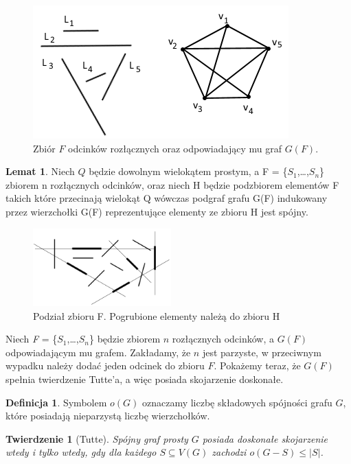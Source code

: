 \documentclass[brudnopis]{xmgr}
\newtheorem{Twierdzenie}{Twierdzenie} \theoremstyle{definition}
\newtheorem{Lemat}{Lemat} \theoremstyle{definition}
\newtheorem{Definicja}{Definicja} \theoremstyle{definition}
\begin{document}
\begin{figure}[ht!]\label{zbior odcinkow rozlacznych}
 \centering
  \includegraphics{rysunki/g_f.png}
  \caption{Zbiór $F$ odcinków rozłącznych oraz odpowiadający mu graf $G(F)$.}
\end{figure} 

\begin{Lemat}\label{podgraf indukowany}
Niech $Q$ będzie dowolnym wielokątem prostym, a F = \textnormal{\{}$S_1$,\ldots,$S_n$\textnormal{\}} zbiorem n rozłącznych odcinków, oraz niech H będzie podzbiorem elementów F takich które przecinają wielokąt Q wówczas podgraf grafu G\textnormal{(}F\textnormal{)} indukowany przez wierzchołki G\textnormal{(}F\textnormal{)} reprezentujące elementy ze zbioru H jest spójny.
\end{Lemat}
\begin{figure}[ht!]
 \centering
  \includegraphics[height=3cm]{rysunki/podzial_h.png}
  \caption{Podział zbioru F. Pogrubione elementy należą do zbioru H}
\end{figure} 
Niech \textit{F} = \{$S_1$,\ldots,$S_n$\} będzie zbiorem $n$ rozłącznych odcinków, a $G(F)$ odpowiadającym mu grafem. Zakładamy, że $n$ jest parzyste, w przeciwnym wypadku należy dodać jeden odcinek do zbioru $F$. Pokażemy teraz, że $G(F)$ spełnia twierdzenie Tutte'a, a więc posiada skojarzenie doskonałe.
\begin{Definicja}
	Symbolem $o(G)$ oznaczamy liczbę składowych spójności grafu $G$, które posiadają nieparzystą liczbę wierzchołków.
\end{Definicja}
\begin{Twierdzenie}[Tutte]
	Spójny graf prosty $G$ posiada \textnormal{doskonałe skojarzenie} wtedy i tylko wtedy, gdy dla każdego $S \subseteq V(G)$ zachodzi $o(G-S) \le |S|$.
\end{Twierdzenie}
\end{document}
